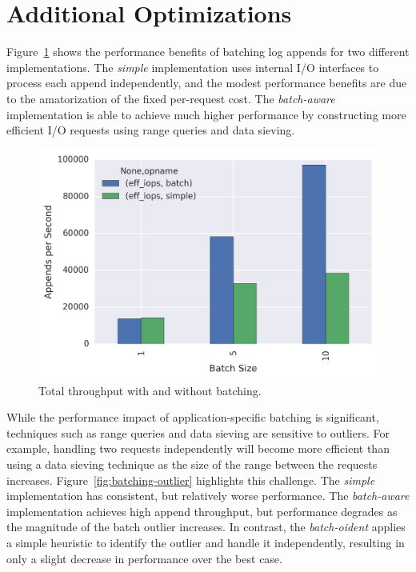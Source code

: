 \section{Additional Optimizations}
\label{sec:opts}

Figure~\ref{fig:batching} shows the performance benefits of batching log
appends for two different implementations. The \emph{simple} implementation
uses internal I/O interfaces to process each append independently, and the
modest performance benefits are due to the amatorization of the fixed
per-request cost. The \emph{batch-aware} implementation is able to achieve much
higher performance by constructing more efficient I/O requests using range
queries and data sieving.

\begin{figure}
\centering
\includegraphics[width=1.0\linewidth]{batching.png}
\caption{Total throughput with and without batching.}
\label{fig:batching}
\end{figure}

While the performance impact of application-specific batching is significant,
techniques such as range queries and data sieving are sensitive to outliers.
For example, handling two requests independently will become more efficient
than using a data sieving technique as the size of the range between the
requests increases. Figure~\ref{fig:batching-outlier} highlights this
challenge. The \emph{simple} implementation has consistent, but relatively
worse performance. The \emph{batch-aware} implementation achieves high append
throughput, but performance degrades as the magnitude of the batch outlier
increases. In contrast, the \emph{batch-oident} applies a simple heuristic to
identify the outlier and handle it independently, resulting in only a slight
decrease in performance over the best case.

